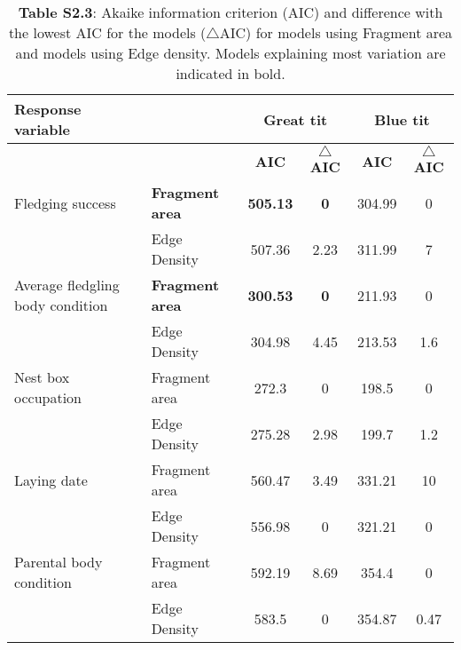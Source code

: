 \documentclass[10pt, twoside]{book} %
\begin{document}
\clearpage
\thispagestyle{plain}
\begin{landscape}
	\begin{table}
		\begin{center}
			\begin{footnotesize}
				\caption*{\textbf{Table S2.3}: Akaike information criterion (AIC) and difference with the lowest AIC for the models ($\bigtriangleup$AIC) for models using Fragment area and models using Edge density. Models explaining most variation are indicated in bold.}
				
				\begingroup
				\setlength{\tabcolsep}{10pt} %
				\renewcommand{\arraystretch}{1.5} %
				\begin{tabular}{l l c c c c}
					\toprule
					\textbf{Response variable} & &  \multicolumn{2}{c}{\textbf{Great tit}} & \multicolumn{2}{c}{\textbf{Blue tit}}\\
					\hline
					
					& & \textbf{AIC} & \textbf{$\bigtriangleup$AIC}& \textbf{AIC} & \textbf{$\bigtriangleup$AIC}\\
					
					\cmidrule(lr){3-4}\cmidrule(lr){5-6}
					
					Fledging success & \textbf{Fragment area} & \textbf{505.13} & \textbf{0} & 	304.99 & 0\\
					& Edge Density & 507.36 & 2.23 & 	311.99 & 7\\
					
					Average fledgling body condition & \textbf{Fragment area} & \textbf{300.53} & \textbf{0} & 211.93 & 0\\
					& Edge Density & 304.98 & 4.45 & 213.53 & 1.6\\
					
					\cmidrule(lr){1-1}
					\cmidrule(lr){2-2}
					\cmidrule(lr){3-4}
					\cmidrule(lr){5-6}
					
					Nest box occupation & Fragment area & 272.3 & 0 & 	198.5 & 0\\
					&Edge Density & 275.28 & 2.98 &199.7 & 1.2\\
					
					Laying date & Fragment area & 560.47 & 3.49 & 	331.21 & 10\\
					& Edge Density & 556.98 & 0 & 	321.21 & 0\\
					
					Parental body condition & Fragment area & 592.19 & 8.69 & 354.4 & 0\\
					&Edge Density & 583.5 & 0 & 	354.87 & 0.47\\
					

\end{tabular}
\end{footnotesize}
\end{center}
\end{table}
\end{landscape}
\end{document}
